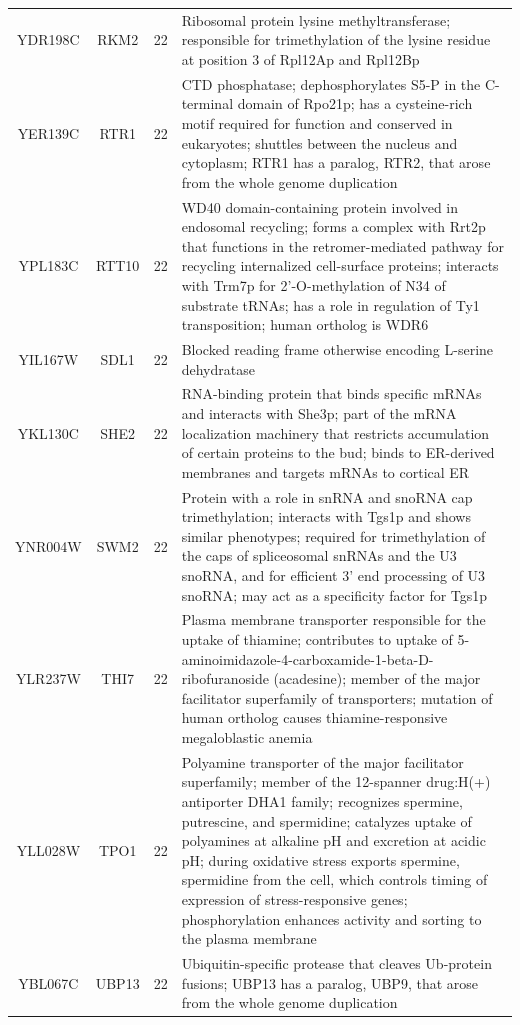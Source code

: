 \documentclass[]{article}
\begin{document}
\begin{longtable}{@{\extracolsep{3pt}} cccp{85mm}}
YDR198C & RKM2 & 22 & Ribosomal protein lysine methyltransferase; responsible for trimethylation of the lysine residue at position 3 of Rpl12Ap and Rpl12Bp \\ 
YER139C & RTR1 & 22 & CTD phosphatase; dephosphorylates S5-P in the C-terminal domain of Rpo21p; has a cysteine-rich motif required for function and conserved in eukaryotes; shuttles between the nucleus and cytoplasm; RTR1 has a paralog, RTR2, that arose from the whole genome duplication \\ 
YPL183C & RTT10 & 22 & WD40 domain-containing protein involved in endosomal recycling; forms a complex with Rrt2p that functions in the retromer-mediated pathway for recycling internalized cell-surface proteins; interacts with Trm7p for 2'-O-methylation of N34 of substrate tRNAs; has a role in regulation of Ty1 transposition; human ortholog is WDR6 \\ 
YIL167W & SDL1 & 22 & Blocked reading frame otherwise encoding L-serine dehydratase \\ 
YKL130C & SHE2 & 22 & RNA-binding protein that binds specific mRNAs and interacts with She3p; part of the mRNA localization machinery that restricts accumulation of certain proteins to the bud; binds to ER-derived membranes and targets mRNAs to cortical ER \\ 
YNR004W & SWM2 & 22 & Protein with a role in snRNA and snoRNA cap trimethylation; interacts with Tgs1p and shows similar phenotypes; required for trimethylation of the caps of spliceosomal snRNAs and the U3 snoRNA, and for efficient 3' end processing of U3 snoRNA; may act as a specificity factor for Tgs1p \\ 
YLR237W & THI7 & 22 & Plasma membrane transporter responsible for the uptake of thiamine; contributes to uptake of 5-aminoimidazole-4-carboxamide-1-beta-D-ribofuranoside (acadesine); member of the major facilitator superfamily of transporters; mutation of human ortholog causes thiamine-responsive megaloblastic anemia \\ 
YLL028W & TPO1 & 22 & Polyamine transporter of the major facilitator superfamily; member of the 12-spanner drug:H(+) antiporter DHA1 family; recognizes spermine, putrescine, and spermidine; catalyzes uptake of polyamines at alkaline pH and excretion at acidic pH; during oxidative stress exports spermine, spermidine from the cell, which controls timing of expression of stress-responsive genes; phosphorylation enhances activity and sorting to the plasma membrane \\ 
YBL067C & UBP13 & 22 & Ubiquitin-specific protease that cleaves Ub-protein fusions; UBP13 has a paralog, UBP9, that arose from the whole genome duplication \\ 

\end{longtable}
\end{document}
